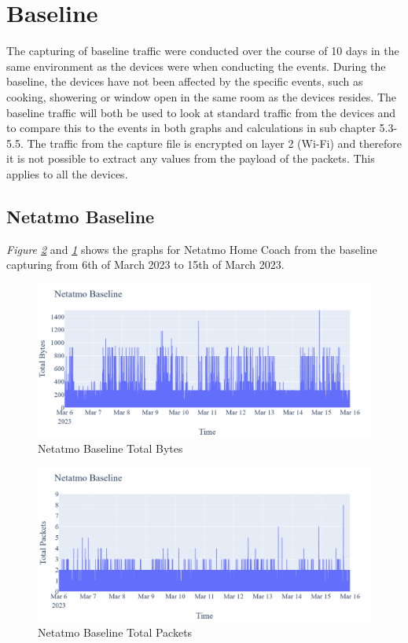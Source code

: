 \section{Baseline}
The capturing of baseline traffic were conducted over the course of 10 days in the same environment as the devices were when conducting the events. During the baseline, the devices have not been affected by the specific events, such as cooking, showering or window open in the same room as the devices resides. The baseline traffic will both be used to look at standard traffic from the devices and to compare this to the events in both graphs and calculations in sub chapter 5.3-5.5. The traffic from the capture file is encrypted on layer 2 (Wi-Fi) and therefore it is not possible to extract any values from the payload of the packets. This applies to all the devices.  
\subsection{Netatmo Baseline}
\textit{Figure \ref{fig:NetatmoBaselineTotalPackets}} and \textit{\ref{fig:NetatmoBaselineTotalBytes}} shows the graphs for Netatmo Home Coach from the baseline capturing from 6th of March 2023 to 15th of March 2023. 
\begin{figure} [H]
    \centering
    \includegraphics[scale=0.3]{figures/Netatmo_Baseline_TotalBytes.png}
    \caption{Netatmo Baseline Total Bytes}
    \label{fig:NetatmoBaselineTotalBytes}
\end{figure}

\begin{figure} [H]         
    \includegraphics[scale=0.3]{figures/Netatmo_Baseline_TotalPackets.png}
    \caption{Netatmo Baseline Total Packets}
    \label{fig:NetatmoBaselineTotalPackets}
 \end{figure}

